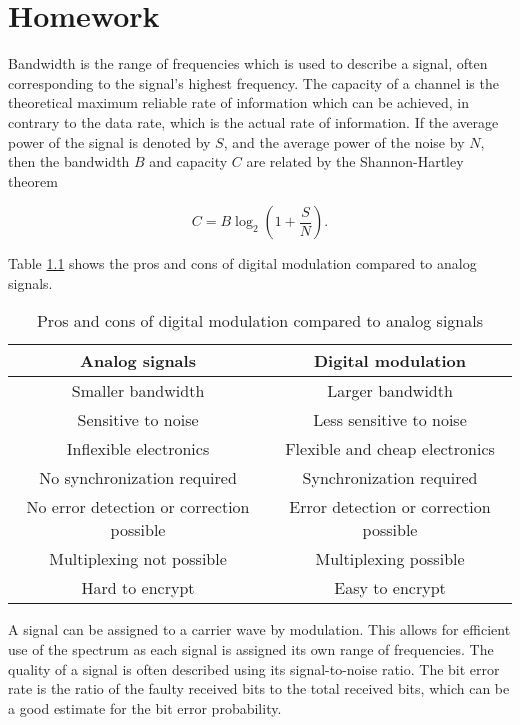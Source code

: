 \documentclass[11pt,titlepage]{report}
\begin{document}
\chapter{Homework}
Bandwidth is the range of frequencies which is used to describe a signal, often corresponding to the signal's highest frequency. The capacity of a channel is the  theoretical maximum reliable rate of information which can be achieved, in contrary to the data rate, which is the actual rate of information. If the average power of the signal is denoted by $S$, and the average power of the noise by $N$, then the bandwidth $B$ and capacity $C$ are related by the Shannon-Hartley theorem

\begin{equation}
	C=B \log_2{\left(1+\frac{S}{N}\right)}.
\end{equation}

Table \ref{tab:pros-cons} shows the pros and cons of digital modulation compared to analog signals.

\begin{table}[H]
	\centering
	\caption{Pros and cons of digital modulation compared to analog signals}
	\label{tab:pros-cons}
	\begin{tabular}{c c}
		\hline\hline
		Analog signals & Digital modulation \\
		\hline
		Smaller bandwidth & Larger bandwidth \\
		Sensitive to noise & Less sensitive to noise \\
		Inflexible electronics & Flexible and cheap electronics \\
		No synchronization required & Synchronization required \\
		No error detection or correction possible & Error detection or correction possible \\
		Multiplexing not possible & Multiplexing possible \\
		Hard to encrypt & Easy to encrypt \\
		\hline
	\end{tabular}
\end{table}

A signal can be assigned to a carrier wave by modulation. This allows for efficient use of the spectrum as each signal is assigned its own range of frequencies. The quality of a signal is often described using its signal-to-noise ratio. The bit error rate is the ratio of the faulty received bits to the total received bits, which can be a good estimate for the bit error probability.
\end{document}
